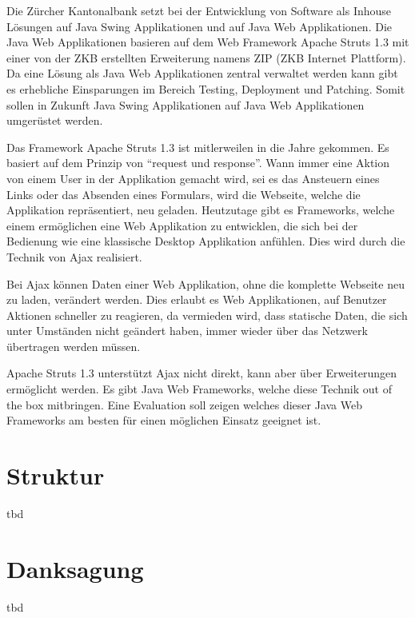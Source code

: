   Die Zürcher Kantonalbank setzt bei der Entwicklung von Software als Inhouse
  Lösungen auf Java Swing Applikationen und auf Java Web Applikationen. Die
  Java Web Applikationen basieren auf dem Web Framework Apache Struts 1.3
  mit einer von der ZKB erstellten Erweiterung namens ZIP (ZKB Internet
  Plattform). Da eine Lösung als Java Web Applikationen zentral verwaltet
  werden kann gibt es erhebliche Einsparungen im Bereich Testing, Deployment
  und Patching. Somit sollen in Zukunft Java Swing Applikationen auf Java Web
  Applikationen umgerüstet werden.
  
  Das Framework Apache Struts 1.3 ist mitlerweilen in die Jahre gekommen. Es
  basiert auf dem Prinzip von ``request und response''. Wann immer eine Aktion
  von einem User in der Applikation gemacht wird, sei es das Ansteuern eines
  Links oder das Absenden eines Formulars, wird die Webseite, welche die
  Applikation repräsentiert, neu geladen. Heutzutage gibt es Frameworks, welche
  einem ermöglichen eine Web Applikation zu entwicklen, die sich bei der
  Bedienung wie eine klassische Desktop Applikation anfühlen. Dies wird durch
  die Technik von \ac{Ajax} realisiert.
  
  Bei \ac{Ajax} können Daten einer Web Applikation, ohne die komplette Webseite
  neu zu laden, verändert werden. Dies erlaubt es Web Applikationen, auf
  Benutzer Aktionen schneller zu reagieren, da vermieden wird, dass statische
  Daten, die sich unter Umständen nicht geändert haben, immer wieder über das
  Netzwerk übertragen werden müssen.
  
  Apache Struts 1.3 unterstützt \ac{Ajax} nicht direkt, kann aber über
  Erweiterungen ermöglicht werden. Es gibt Java Web Frameworks, welche diese
  Technik out of the box mitbringen. Eine Evaluation soll zeigen welches dieser
  Java Web Frameworks am besten für einen möglichen Einsatz geeignet ist.
  
  \section{Struktur}
  
  tbd
  
  \section{Danksagung}
  
  tbd
  
